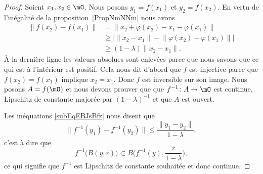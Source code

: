 \begin{proof}
        Soient \( x_1,x_2\in\mO\). Nous posons \( y_1=f(x_1)\) et \( y_2=f(x_2)\). En vertu de l'inégalité de la proposition~\ref{PropNmNNm} nous avons
        \begin{subequations}    \label{subEqEBJsBfz}
            \begin{align}
            \big\| f(x_2)-f(x_1) \big\|&=\big\| x_2+\varphi(x_2)-x_1-\varphi(x_1) \big\|\\
        &\geq \Big|        \| x_2-x_1 \|-\big\| \varphi(x_2)-\varphi(x_1) \big\|  \Big|\\
    &\geq   (1-\lambda)\| x_2-x_1 \|.
            \end{align}
        \end{subequations}
        À la dernière ligne les valeurs absolues sont enlevées parce que nous savons que ce qui est à l'intérieur est positif. Cela nous dit d'abord que \( f\) est injective parce que \( f(x_2)=f(x_1)\) implique \( x_2=x_1\). Donc \( f\) est inversible sur son image. Nous posons \( A=f(\mO)\) et nous devons prouver que que \( f^{-1}\colon A\to \mO\) est continue, Lipschitz de constante majorée par \( (1-\lambda)^{-1}\) et que \( A\) est ouvert.

    Les inéquations \eqref{subEqEBJsBfz} nous disent que
    \begin{equation}
    \big\| f^{-1}(y_1)-f^{-1}(y_2) \big\|\leq \frac{ \| y_1-y_2 \| }{ 1-\lambda },
    \end{equation}
    c'est à dire que
    \begin{equation}
        f^{-1}\big( B(y,r) \big)\subset B\big( f^{-1}(y),\frac{ r }{ 1-\lambda } \big),
    \end{equation}
    ce qui signifie que \( f^{-1}\) est Lipschitz de constante souhaitée et donc continue.


\end{proof}
